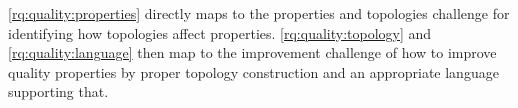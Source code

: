 \autoref{rq:quality:properties} directly maps to the properties and topologies challenge for identifying how topologies affect properties.
\autoref{rq:quality:topology} and \autoref{rq:quality:language} then map to the improvement challenge of how to improve quality properties by proper topology construction and an appropriate language supporting that.






